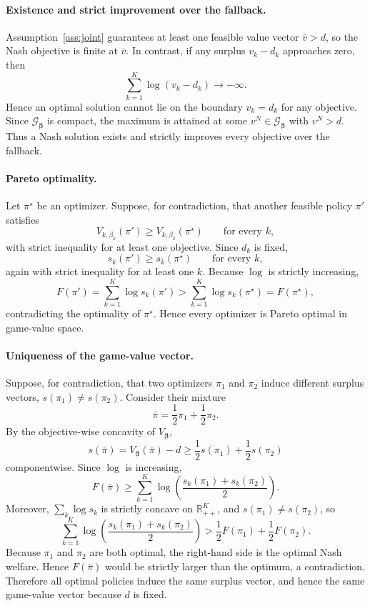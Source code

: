 \documentclass{article}
\theoremstyle{remark}
\theoremstyle{plain}
\newcommand{\G}{\mathcal{G}}
\newcommand{\R}{\mathbb{R}}
\begin{document}
\paragraph{Existence and strict improvement over the fallback.}
Assumption~\ref{ass:joint} guarantees at least one feasible value vector
$\bar v>d$, so the Nash objective is finite at $\bar v$. In contrast,
if any surplus $v_k-d_k$ approaches zero, then
\[
\sum_{k=1}^K\log(v_k-d_k)\to-\infty.
\]
Hence an optimal solution cannot lie on the boundary
$v_k=d_k$ for any objective. Since $\G_{\boldsymbol\beta}$ is compact,
the maximum is attained at some $v^N\in\G_{\boldsymbol\beta}$ with
$v^N>d$. Thus a Nash solution exists and strictly improves every
objective over the fallback.

\paragraph{Pareto optimality.}
Let $\pi^\star$ be an optimizer. Suppose, for contradiction, that
another feasible policy $\pi'$ satisfies
\[
V_{k,\beta_k}(\pi')
\ge
V_{k,\beta_k}(\pi^\star)
\qquad\text{for every }k,
\]
with strict inequality for at least one objective. Since $d_k$ is fixed,
\[
s_k(\pi')
\ge
s_k(\pi^\star)
\qquad\text{for every }k,
\]
again with strict inequality for at least one $k$. Because $\log$ is
strictly increasing,
\[
F(\pi')
=
\sum_{k=1}^K\log s_k(\pi')
>
\sum_{k=1}^K\log s_k(\pi^\star)
=
F(\pi^\star),
\]
contradicting the optimality of $\pi^\star$. Hence every optimizer is
Pareto optimal in game-value space.

\paragraph{Uniqueness of the game-value vector.}
Suppose, for contradiction, that two optimizers $\pi_1$ and $\pi_2$
induce different surplus vectors,
$s(\pi_1)\neq s(\pi_2)$. Consider their mixture
\[
\bar\pi=\frac12\pi_1+\frac12\pi_2.
\]
By the objective-wise concavity of $V_{\boldsymbol\beta}$,
\[
s(\bar\pi)
=
V_{\boldsymbol\beta}(\bar\pi)-d
\ge
\frac12s(\pi_1)+\frac12s(\pi_2)
\]
componentwise. Since $\log$ is increasing,
\[
F(\bar\pi)
\ge
\sum_{k=1}^K
\log\!\left(
\frac{s_k(\pi_1)+s_k(\pi_2)}{2}
\right).
\]
Moreover, $\sum_k\log s_k$ is strictly concave on $\R_{++}^K$, and
$s(\pi_1)\neq s(\pi_2)$, so
\[
\sum_{k=1}^K
\log\!\left(
\frac{s_k(\pi_1)+s_k(\pi_2)}{2}
\right)
>
\frac12F(\pi_1)+\frac12F(\pi_2).
\]
Because $\pi_1$ and $\pi_2$ are both optimal, the right-hand side is
the optimal Nash welfare. Hence $F(\bar\pi)$ would be strictly larger
than the optimum, a contradiction. Therefore all optimal policies
induce the same surplus vector, and hence the same game-value vector
because $d$ is fixed.
\end{document}
